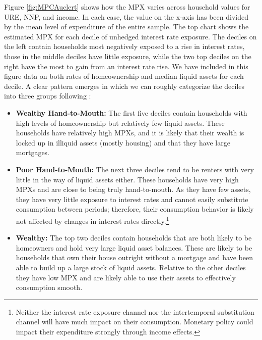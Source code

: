 \documentclass[titlepage]{\econtex}\newcommand{\texname}{ConsumptionHeterogeneity}
\begin{document}
Figure \ref{fig:MPCAuclert} shows how the MPX varies across household values for URE, NNP, and income. In each case, the value on the x-axis has been divided by the mean level of expenditure of the entire sample. The top chart shows the estimated MPX for each decile of unhedged interest rate exposure. The deciles on the left contain households most negatively exposed to a rise in interest rates, those in the middle deciles have little exposure, while the two top deciles on the right have the most to gain from an interest rate rise. We have included in this figure data on both rates of homeownership and median liquid assets for each decile. A clear pattern emerges in which we can roughly categorize the deciles into three groups following \cite{violante_wealthy_2014}:
\begin{itemize}
	\item \textbf{Wealthy Hand-to-Mouth:} The first five deciles contain households with high levels of homeownership but relatively few liquid assets. These households have relatively high MPXs, and it is likely that their wealth is locked up in illiquid assets (mostly housing) and that they have large mortgages.
	\item \textbf{Poor Hand-to-Mouth:} The next three deciles tend to be renters with very little in the way of liquid assets either. These households have very high MPXs and are close to being truly hand-to-mouth. As they have few assets, they have very little exposure to interest rates and cannot easily substitute consumption between periods; therefore, their consumption behavior is likely not affected by changes in interest rates directly.\footnote{Neither the interest rate exposure channel nor the intertemporal substitution channel will have much impact on their consumption. Monetary policy could impact their expenditure strongly through income effects.}
	\item \textbf{Wealthy:} The top two deciles contain households that are both likely to be homeowners and hold very large liquid asset balances. These are likely to be households that own their house outright without a mortgage and have been able to build up a large stock of liquid assets. Relative to the other deciles they have low MPX and are likely able to use their assets to effectively consumption smooth.
\end{itemize}
\end{document}
